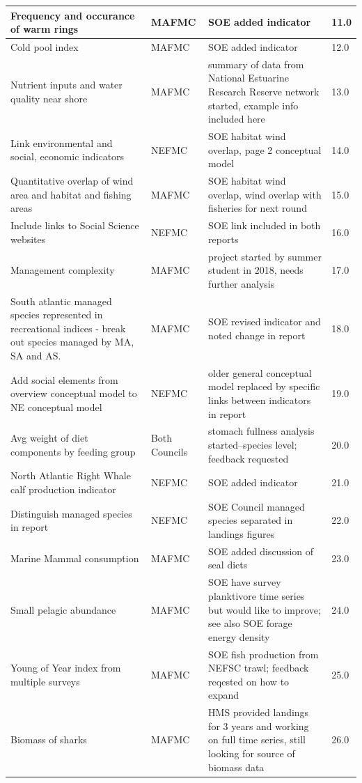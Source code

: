 \documentclass[10pt,]{article}
\let\origtable\table
\let\endorigtable\endtable
\renewenvironment{table}[1][2] {
    \expandafter\origtable\expandafter[H]
} {
    \endorigtable
}
\begin{document}
\begin{table}[!h]
{\begin{tabular}{l|l|l|l}
\hline
Frequency and occurance of warm rings & MAFMC & SOE added indicator & 11.0\\
\hline
Cold pool index & MAFMC & SOE added indicator & 12.0\\
\hline
Nutrient inputs and water quality near shore & MAFMC & summary of data from National Estuarine Research Reserve network started, example info included here & 13.0\\
\hline
Link environmental and social, economic indicators & NEFMC & SOE habitat wind overlap, page 2 conceptual model & 14.0\\
\hline
Quantitative overlap of wind area and habitat and fishing areas & MAFMC & SOE habitat wind overlap, wind overlap with fisheries for next round & 15.0\\
\hline
Include links to Social Science websites & NEFMC & SOE link included in both reports & 16.0\\
\hline
Management complexity & MAFMC & project started by summer student in 2018, needs further analysis & 17.0\\
\hline
South atlantic managed species represented in recreational indices - break out species managed by MA, SA and AS. & MAFMC & SOE revised indicator and noted change in report & 18.0\\
\hline
Add social elements from overview conceptual model to NE conceptual model & NEFMC & older general conceptual model replaced by specific links between indicators in report & 19.0\\
\hline
Avg weight of diet components by feeding group & Both Councils & stomach fullness analysis started--species level; feedback requested & 20.0\\
\hline
North Atlantic Right Whale calf production indicator & NEFMC & SOE added indicator & 21.0\\
\hline
Distinguish managed species in report & NEFMC & SOE Council managed species separated in landings figures & 22.0\\
\hline
Marine Mammal consumption & MAFMC & SOE added discussion of seal diets & 23.0\\
\hline
Small pelagic abundance & MAFMC & SOE have survey planktivore time series but would like to improve; see also SOE forage energy density & 24.0\\
\hline
Young of Year index from multiple surveys & MAFMC & SOE fish production from NEFSC trawl; feedback reqested on how to expand & 25.0\\
\hline
Biomass of sharks & MAFMC & HMS provided landings for 3 years and working on full time series, still looking for source of biomass data & 26.0\\

\end{tabular}}
\end{table}
\end{document}
